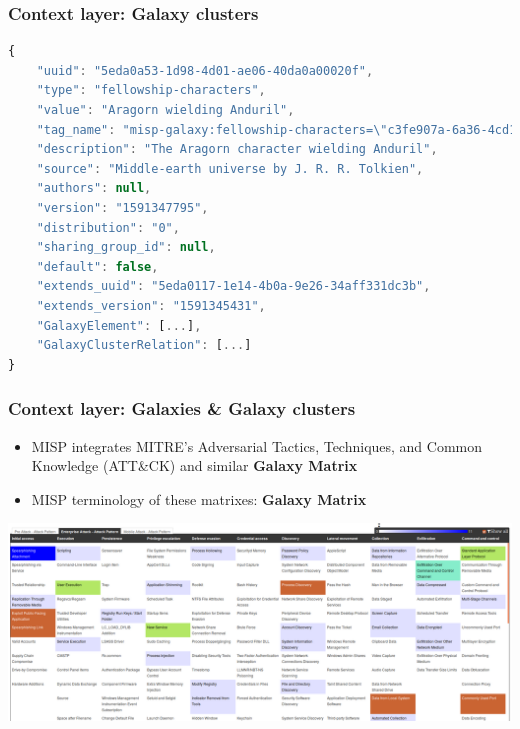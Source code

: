 \begin{frame}[fragile]
    \frametitle{Context layer: Galaxy clusters}
    \begin{lstlisting}[language=javascript,firstnumber=1]
{
    "uuid": "5eda0a53-1d98-4d01-ae06-40da0a00020f",
    "type": "fellowship-characters",
    "value": "Aragorn wielding Anduril",
    "tag_name": "misp-galaxy:fellowship-characters=\"c3fe907a-6a36-4cd1-9456-dcdf35c3f907\"",
    "description": "The Aragorn character wielding Anduril",
    "source": "Middle-earth universe by J. R. R. Tolkien",
    "authors": null,
    "version": "1591347795",
    "distribution": "0",
    "sharing_group_id": null,
    "default": false,
    "extends_uuid": "5eda0117-1e14-4b0a-9e26-34aff331dc3b",
    "extends_version": "1591345431",
    "GalaxyElement": [...],
    "GalaxyClusterRelation": [...]
}
\end{lstlisting}
\end{frame}


\begin{frame}
    \frametitle{Context layer: Galaxies \& Galaxy clusters}
    \begin{itemize}
        \item MISP integrates MITRE's Adversarial Tactics, Techniques, and Common Knowledge (ATT\&CK) and similar {\bf Galaxy Matrix}
        \item MISP terminology of these matrixes: {\bf Galaxy Matrix}
    \end{itemize}
    \includegraphics[scale=0.2]{screenshots/attack-screenshot.png}
\end{frame}

